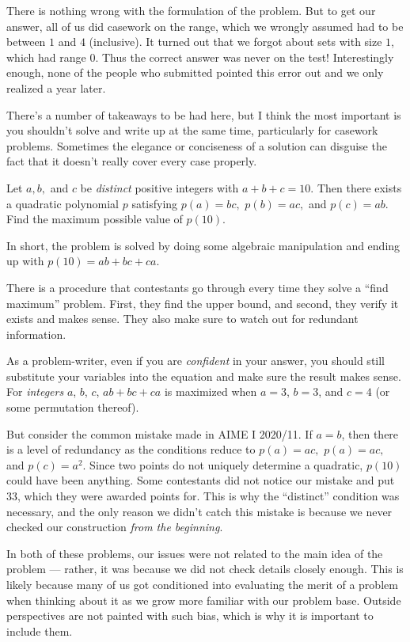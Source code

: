 \documentclass[points=false]{bounce}
\begin{document}
There is nothing wrong with the formulation of the problem. But to get our answer, all of us did casework on the range, which we wrongly assumed had to be between $1$ and $4$ (inclusive). It turned out that we forgot about sets with size $1$, which had range $0$. Thus the correct answer was never on the test! Interestingly enough, none of the people who submitted pointed this error out and we only realized a year later.

There's a number of takeaways to be had here, but I think the most important is you shouldn't solve and write up at the same time, particularly for casework problems. Sometimes the elegance or conciseness of a solution can disguise the fact that it doesn't really cover every case properly.

\begin{exam}[MAT 2021/5]
    Let $a, b,$ and $c$ be \emph{distinct} positive integers with $a + b + c = 10.$ Then there exists a quadratic polynomial $p$ satisfying $p(a) = bc,$ $p(b) = ac,$ and $p(c) = ab.$ Find the maximum possible value of $p(10).$
\end{exam}

In short, the problem is solved by doing some algebraic manipulation and ending up with $p(10)=ab+bc+ca$.

There is a procedure that contestants go through every time they solve a ``find maximum'' problem. First, they find the upper bound, and second, they verify it exists and makes sense. They also make sure to watch out for redundant information.

As a problem-writer, even if you are \emph{confident} in your answer, you should still substitute your variables into the equation and make sure the result makes sense. For \emph{integers} $a$, $b$, $c$, $ab+bc+ca$ is maximized when $a=3$, $b=3$, and $c=4$ (or some permutation thereof).

But consider the common mistake made in AIME I 2020/11. If $a=b$, then there is a level of redundancy as the conditions reduce to $p(a)=ac,$ $p(a)=ac,$ and $p(c)=a^2$. Since two points do not uniquely determine a quadratic, $p(10)$ could have been anything. Some contestants did not notice our mistake and put $33$, which they were awarded points for. This is why the ``distinct'' condition was necessary, and the only reason we didn't catch this mistake is because we never checked our construction \emph{from the beginning}.

In both of these problems, our issues were not related to the main idea of the problem --- rather, it was because we did not check details closely enough. This is likely because many of us got conditioned into evaluating the merit of a problem when thinking about it as we grow more familiar with our problem base. Outside perspectives are not painted with such bias, which is why it is important to include them. 
\end{document}
